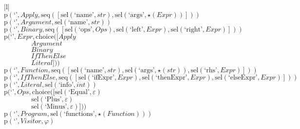 \footnotesize\begin{center}\begin{tabular}{|l|}\hline
{}
\\\hline
$\mathrm{p}(\text{`'},\mathit{Apply},\mathrm{seq}\left(\left[\mathrm{sel}\left(\text{`name'},str\right), \mathrm{sel}\left(\text{`args'},\star \left(\mathit{Expr}\right)\right)\right]\right))$	\\
$\mathrm{p}(\text{`'},\mathit{Argument},\mathrm{sel}\left(\text{`name'},str\right))$	\\
$\mathrm{p}(\text{`'},\mathit{Binary},\mathrm{seq}\left(\left[\mathrm{sel}\left(\text{`ops'},\mathit{Ops}\right), \mathrm{sel}\left(\text{`left'},\mathit{Expr}\right), \mathrm{sel}\left(\text{`right'},\mathit{Expr}\right)\right]\right))$	\\
$\mathrm{p}(\text{`'},\mathit{Expr},\mathrm{choice}([\mathit{Apply}$\\$\qquad\qquad\mathit{Argument}$\\$\qquad\qquad\mathit{Binary}$\\$\qquad\qquad\mathit{IfThenElse}$\\$\qquad\qquad\mathit{Literal}]))$	\\
$\mathrm{p}(\text{`'},\mathit{Function},\mathrm{seq}\left(\left[\mathrm{sel}\left(\text{`name'},str\right), \mathrm{sel}\left(\text{`args'},\star \left(str\right)\right), \mathrm{sel}\left(\text{`rhs'},\mathit{Expr}\right)\right]\right))$	\\
$\mathrm{p}(\text{`'},\mathit{IfThenElse},\mathrm{seq}\left(\left[\mathrm{sel}\left(\text{`ifExpr'},\mathit{Expr}\right), \mathrm{sel}\left(\text{`thenExpr'},\mathit{Expr}\right), \mathrm{sel}\left(\text{`elseExpr'},\mathit{Expr}\right)\right]\right))$	\\
$\mathrm{p}(\text{`'},\mathit{Literal},\mathrm{sel}\left(\text{`info'},int\right))$	\\
$\mathrm{p}(\text{`'},\mathit{Ops},\mathrm{choice}([\mathrm{sel}\left(\text{`Equal'},\varepsilon\right)$\\$\qquad\qquad\mathrm{sel}\left(\text{`Plus'},\varepsilon\right)$\\$\qquad\qquad\mathrm{sel}\left(\text{`Minus'},\varepsilon\right)]))$	\\
$\mathrm{p}(\text{`'},\mathit{Program},\mathrm{sel}\left(\text{`functions'},\star \left(\mathit{Function}\right)\right))$	\\
$\mathrm{p}(\text{`'},\mathit{Visitor},\varphi)$	\\
\hline\end{tabular}\end{center}



